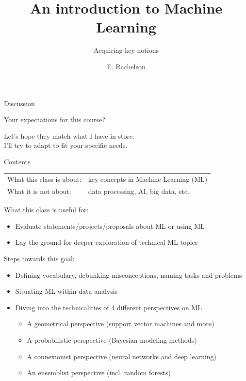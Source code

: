 \documentclass[10pt,a4paper,t,aspectratio=1610,dvipsnames]{beamer}
\title{An introduction to Machine Learning}
\subtitle{Acquiring key notions}
\author{E. Rachelson}
\institute{\texttt{[image: img/isae.jpg]}}
\date{}
\begin{document}
\begin{frame}[plain]
\titlepage
\end{frame}

\begin{frame}{Discussion}
	
	\begin{center}
		\vfill
		Your expectations for this course?
	\end{center}
	
	\vspace{3em}
	{\footnotesize Let's hope they match what I have in store.\\
	I'll try to adapt to fit your specific needs.}
\end{frame}

\begin{frame}{Contents}
\begin{tabular}{@{}ll}
What this class is about: & key concepts in Machine Learning (ML)\\
What it is not about: & data processing, AI, big data, etc.
\end{tabular}

\vspace{2em}
\indent What this class is useful for:
\begin{itemize}
	\item[] Evaluate statements/projects/proposals about ML or using ML
	\item[] Lay the ground for deeper exploration of technical ML topics
\end{itemize}

\vspace{2em}
Steps towards this goal:
\begin{itemize}
	\item Defining vocabulary, debunking misconceptions, naming tasks and problems
	\item Situating ML within data analysis
	\item Diving into the technicalities of 4 different perspectives on ML
	\begin{itemize}
		\item A geometrical perspective (support vector machines and more)
		\item A probabilistic perspective (Bayesian modeling methods)
		\item A connexionist perspective (neural networks and deep learning)
		\item An ensemblist perspective (incl. random forests)
	\end{itemize}
\end{itemize}
\end{frame}
\end{document}
